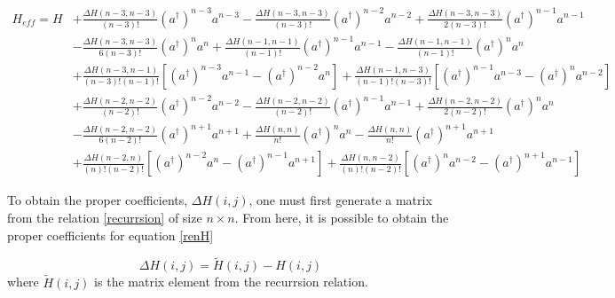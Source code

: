 \documentclass[%
 reprint,
nofootinbib,
 amsmath,amssymb,
 aps,
]{revtex4-2}
\numberwithin{equation}{section}
\begin{document}
\begin{widetext}
\begin{align}
  \label{renH}
  H_{eff} = H &+ \frac{\Delta H(n-3, n-3)}{(n-3)!}(a^\dagger)^{n-3}a^{n-3} - \frac{\Delta H(n-3, n-3)}{(n-3)!}(a^\dagger)^{n-2}a^{n-2} + \frac{\Delta H(n-3, n-3)}{2(n-3)!}(a^\dagger)^{n-1}a^{n-1}\\ \nonumber
             &- \frac{\Delta H(n-3, n-3)}{6(n-3)!}(a^\dagger)^{n}a^{n} +  \frac{\Delta H(n-1, n-1)}{(n-1)!}(a^\dagger)^{n - 1}a^{n - 1} - \frac{\Delta H(n-1, n-1)}{(n-1)!}(a^\dagger)^{n}a^{n}\\ \nonumber
             &+ \frac{\Delta H(n-3, n-1)}{(n-3)!(n-1)!}\left[(a^\dagger)^{n-3}a^{n-1} - (a^\dagger)^{n-2}a^{n} \right]+ \frac{\Delta H(n-1, n-3)}{(n-1)!(n-3)!}\left[(a^\dagger)^{n-1}a^{n-3} - (a^\dagger)^{n}a^{n-2} \right] \\ \nonumber
             &+ \frac{\Delta H(n-2, n-2)}{(n-2)!}(a^\dagger)^{n-2}a^{n-2} - \frac{\Delta H(n-2, n-2)}{(n-2)!}(a^\dagger)^{n-1}a^{n-1} + \frac{\Delta H(n-2, n-2)}{2(n-2)!}(a^\dagger)^{n}a^{n} \\ \nonumber
             &-\frac{\Delta H(n-2, n-2)}{6(n-2)!}(a^\dagger)^{n+1}a^{n+1} + \frac{\Delta H(n, n)}{n!}(a^\dagger)^n a^n -\frac{\Delta H(n, n)}{n!}(a^\dagger)^{n + 1} a^{n + 1} \\ \nonumber
             &+ \frac{\Delta H(n-2, n)}{(n)!(n-2)!}\left[(a^\dagger)^{n-2}a^{n} - (a^\dagger)^{n-1}a^{n+1} \right]+ \frac{\Delta H(n, n-2)}{(n)!(n-2)!}\left[(a^\dagger)^{n}a^{n-2} - (a^\dagger)^{n+1}a^{n-1} \right]
\end{align}
\end{widetext}

To obtain the proper coefficients, $\Delta H(i,j)$, one must first generate a matrix from the relation \ref{recurrsion} of size $n \times n$. From here, it is possible to obtain the proper coefficients for equation \ref{renH}

\begin{equation}
  \Delta H(i, j) = \tilde{H}(i,j) - H(i,j)
\end{equation}
where $\tilde{H}(i,j)$ is the matrix element from the recurrsion relation.
\end{document}
